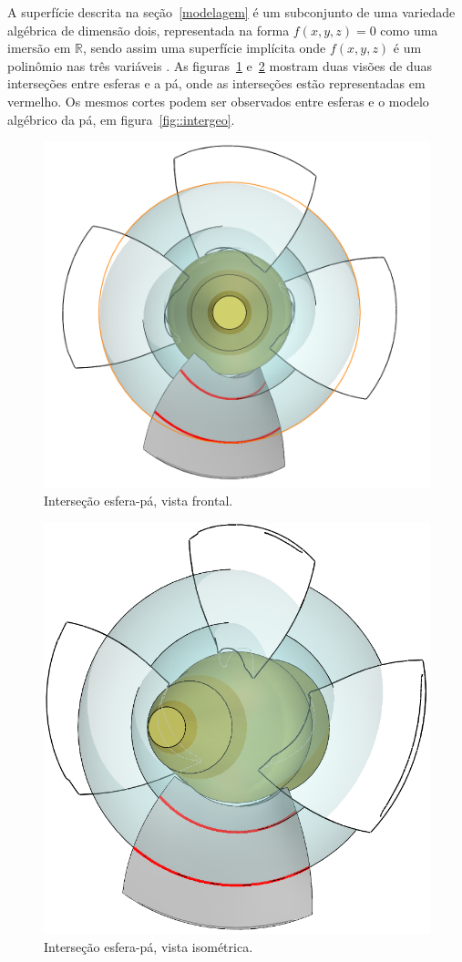 A superfície descrita na seção~\ref{modelagem} é um subconjunto de uma
variedade algébrica de dimensão dois, representada na forma $f(x,y,z)=0$ como
uma imersão em $\mathbb{R}$, sendo assim uma superfície implícita onde
$f(x,y,z)$ é um polinômio nas três variáveis .
As
figuras~\ref{fig::interfrontal} e~\ref{fig::interiso} mostram duas visões de
duas interseções entre esferas e a pá, onde as interseções estão representadas
em vermelho. Os mesmos cortes podem ser observados entre esferas e o modelo
algébrico da pá, em figura~\ref{fig::intergeo}.


\begin{figure}[!ht]
	\centering
	\includegraphics[width=.7\columnwidth]{figs/planejamento/intersecao_frontal.PNG}
	\caption{Interseção esfera-pá, vista frontal.}
	\label{fig::interfrontal}
\end{figure}

\begin{figure}[!ht]
	\centering
	\includegraphics[width=.6\columnwidth]{figs/planejamento/intersecao_iso.PNG}
	\caption{Interseção esfera-pá, vista isométrica.}
	\label{fig::interiso}
\end{figure}

